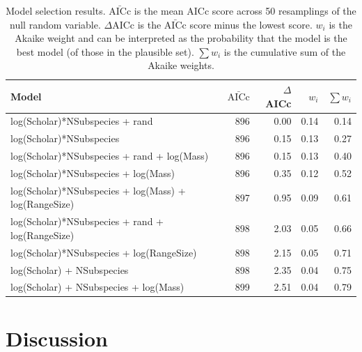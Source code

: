 \begin{table}[t]
\begin{tabular}{>{\small}lrrrr}

\normalsize{Model} & $\bar{\text{AICc}}$ & $\Delta$AICc & $w_i$ & $\sum w_i$\\
\hline
log(Scholar)*NSubspecies + rand & 
896 & 0.00 &
0.14 & 0.14\\
log(Scholar)*NSubspecies & 
896 & 0.15 &
0.13 & 0.27\\
log(Scholar)*NSubspecies + rand + log(Mass) & 
896 & 0.15 &
0.13 & 0.40\\
log(Scholar)*NSubspecies  + log(Mass) & 
896 & 0.35 &
0.12 & 0.52\\
log(Scholar)*NSubspecies  + log(Mass) + log(RangeSize) & 
897 & 0.95 &
0.09 & 0.61\\
log(Scholar)*NSubspecies  + rand + log(RangeSize) & 
898 & 2.03 &
0.05 & 0.66\\
log(Scholar)*NSubspecies  + log(RangeSize) & 
898 & 2.15 &
0.05 & 0.71\\
log(Scholar) + NSubspecies & 
898 & 2.35 &
0.04 & 0.75\\
log(Scholar) + NSubspecies + log(Mass) & 
899 & 2.51 &
0.04 & 0.79
\end{tabular}
\caption{
Model selection results. 
$\bar{\text{AICc}}$ is the mean AICc score across 50 resamplings of the null random variable. 
$\Delta$AICc is the $\bar{\text{AICc}}$ score minus the lowest score. 
$w_i$ is the Akaike weight and can be interpreted as the probability that the model is the best model (of those in the plausible set).
$\sum w_i$ is the cumulative sum of the Akaike weights.}
\label{t:subsmodels}
\end{table}





\clearpage
\section{Discussion}  

















